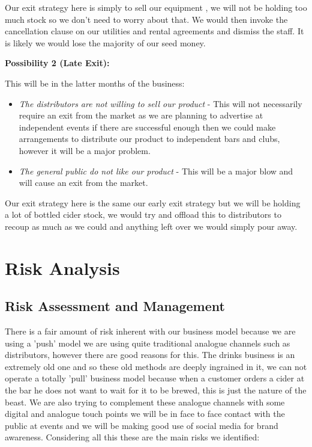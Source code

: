 \documentclass[11pt]{article}
\begin{document}
Our exit strategy here is simply to sell our equipment , we will not be holding
too much stock so we don't need to worry about that. We would then invoke the
cancellation clause on our utilities and rental agreements and dismiss the
staff. It is likely we would lose the majority of our seed money.

\textbf{Possibility 2 (Late Exit):}

This will be in the latter months of the business:
  \begin{itemize}
	\item \emph{The distributors are not willing to sell our product} - This will
not necessarily require an exit from the market as we are planning to advertise
at independent events if there are successful enough then we could make
arrangements to distribute our product to independent bars and clubs, however it
will be a major problem.
	\item \emph{The general public do not like our product} - This will be a major
blow and will cause an exit from the market.
  \end{itemize}

Our exit strategy here is the same our early exit strategy but we will be 
holding a lot of bottled cider stock, we would try and offload this to
distributors to recoup as much as we could and anything left over we would
simply pour away.

\newpage


\section{Risk Analysis}

  \subsection{Risk Assessment and Management}
There is a fair amount of risk inherent with our business model because we are 
using a 'push' model we are using quite traditional analogue channels such as 
distributors, however there are good reasons for this. The drinks business is an
extremely old one and so these old methods are deeply ingrained in it, we can not 
operate a totally 'pull' business model because when a customer orders a cider 
at the bar he does not want to wait for it to be brewed, this is just the nature
of the beast. We are also trying to complement these analogue channels with some
digital and analogue touch points we will be in face to face contact with the 
public at events and we will be making good use of social media for brand 
awareness. Considering all this these are the main risks we identified:
\end{document}
